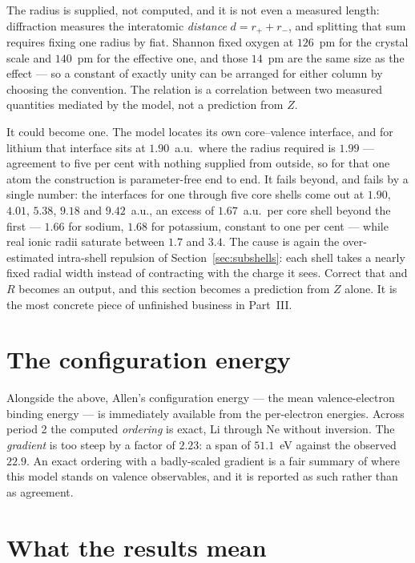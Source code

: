 The radius is supplied, not computed, and it is not even a measured length: diffraction measures
the interatomic \emph{distance} $d = r_+ + r_-$, and splitting that sum requires fixing one radius
by fiat. Shannon fixed oxygen at $126$~pm for the crystal scale and $140$~pm for the effective
one, and those $14$~pm are the same size as the effect --- so a constant of exactly unity can be
arranged for either column by choosing the convention. The relation is a correlation between two
measured quantities mediated by the model, not a prediction from $Z$.

It could become one. The model locates its own core--valence interface, and for lithium that
interface sits at $1.90$~a.u.\ where the radius required is $1.99$ --- agreement to five per cent
with nothing supplied from outside, so for that one atom the construction is parameter-free end to
end. It fails beyond, and fails by a single number: the interfaces for one through five core
shells come out at $1.90$, $4.01$, $5.38$, $9.18$ and $9.42$~a.u., an excess of $1.67$~a.u.\ per
core shell beyond the first --- $1.66$ for sodium, $1.68$ for potassium, constant to one per cent
--- while real ionic radii saturate between $1.7$ and $3.4$. The cause is again the over-estimated
intra-shell repulsion of Section~\ref{sec:subshells}: each shell takes a nearly fixed radial width
instead of contracting with the charge it sees. Correct that and $R$ becomes an output, and this
section becomes a prediction from $Z$ alone. It is the most concrete piece of unfinished business
in Part~III.

\section{The configuration energy}\label{sec:chi-allen}

Alongside the above, Allen's configuration energy --- the mean valence-electron binding energy ---
is immediately available from the per-electron energies. Across period 2 the computed
\emph{ordering} is exact, Li through Ne without inversion. The \emph{gradient} is too steep by a
factor of $2.23$: a span of $51.1$~eV against the observed $22.9$. An exact ordering with a
badly-scaled gradient is a fair summary of where this model stands on valence observables, and it
is reported as such rather than as agreement.

\section{What the results mean}\label{sec:meaning}

